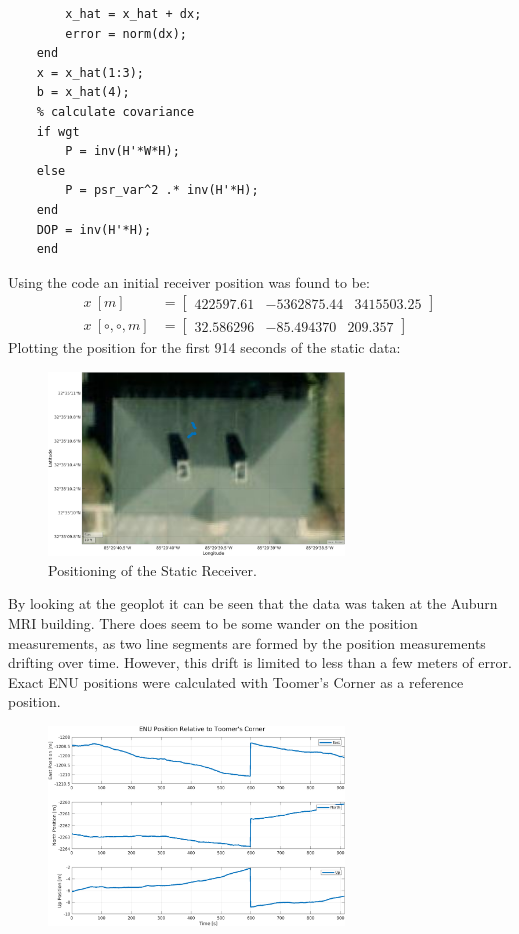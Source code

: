 \documentclass[11pt]{article}
\begin{document}
\begin{enumerate}[label=\textbf{\arabic*.}]
\begin{lstlisting}
        x_hat = x_hat + dx;
        error = norm(dx);
    end
    x = x_hat(1:3);
    b = x_hat(4);
    % calculate covariance
    if wgt
        P = inv(H'*W*H);
    else
        P = psr_var^2 .* inv(H'*H);
    end
    DOP = inv(H'*H);
    end    
  \end{lstlisting}
  Using the code an initial receiver position was found to be: 
  \begin{equation*}
    \begin{split}
      x \:\si{[m]} &= 
      \begin{bmatrix}
        422597.61 & -5362875.44 & 3415503.25
      \end{bmatrix} \\
      x \:\si{[\circ, \circ, m]} &=
      \begin{bmatrix}
        32.586296 & -85.494370 & 209.357
      \end{bmatrix}
    \end{split}
  \end{equation*}
  Plotting the position for the first 914 seconds of the static data:
  \begin{figure}[H]
    \centering
    \includegraphics[width=0.7\textwidth]{static_pos.png}
    \caption{Positioning of the Static Receiver.}
  \end{figure}
  By looking at the geoplot it can be seen that the data was taken at the Auburn MRI 
  building. There does seem to be some wander on the position measurements, as 
  two line segments are formed by the position measurements drifting over time. 
  However, this drift is limited to less than a few meters of error. Exact ENU 
  positions were calculated with Toomer's Corner as a reference position. 
  \begin{figure}[H]
    \centering
    \includegraphics[width=0.7\textwidth]{static_pos_enu.png}

\end{figure}
\end{enumerate}
\end{document}
